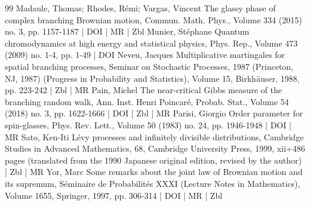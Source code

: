 \begin{thebibliography}{99}
 Madaule, Thomas; Rhodes, Rémi; Vargas, Vincent The glassy phase of complex branching Brownian motion, Commun. Math. Phys., Volume 334 (2015) no. 3, pp. 1157-1187 | DOI | MR | Zbl
 Munier, Stéphane Quantum chromodynamics at high energy and statistical physics, Phys. Rep., Volume 473 (2009) no. 1-4, pp. 1-49 | DOI
 Neveu, Jacques Multiplicative martingales for spatial branching processes, Seminar on Stochastic Processes, 1987 (Princeton, NJ, 1987) (Progress in Probability and Statistics), Volume 15, Birkhäuser, 1988, pp. 223-242 | Zbl | MR
 Pain, Michel The near-critical Gibbs measure of the branching random walk, Ann. Inst. Henri Poincaré, Probab. Stat., Volume 54 (2018) no. 3, pp. 1622-1666 | DOI | Zbl | MR
 Parisi, Giorgio Order parameter for spin-glasses, Phys. Rev. Lett., Volume 50 (1983) no. 24, pp. 1946-1948 | DOI | MR
 Sato, Ken-Iti Lévy processes and infinitely divisible distributions, Cambridge Studies in Advanced Mathematics, 68, Cambridge University Press, 1999, xii+486 pages (translated from the 1990 Japanese original edition, revised by the author) | Zbl | MR
 Yor, Marc Some remarks about the joint law of Brownian motion and its supremum, Séminaire de Probabilités XXXI (Lecture Notes in Mathematics), Volume 1655, Springer, 1997, pp. 306-314 | DOI | MR | Zbl
\end{thebibliography}
